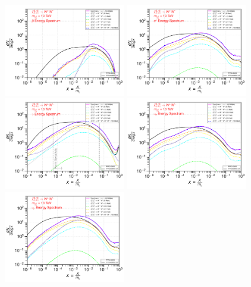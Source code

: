 \documentclass[epj,nopacs,fleqn]{svjour}
\begin{document}
\begin{figure}[!h]
	\centering
	\subfigure
	{ \includegraphics[width=0.48\textwidth]{Fig/n1ww_comparison/10000_antiprotons_n1ww_comparison.pdf} } 
	\subfigure
	{\includegraphics[width=0.48\textwidth]{Fig/n1ww_comparison/10000_positrons_n1ww_comparison.pdf} }
	\subfigure
	{\includegraphics[width=0.48\textwidth]{Fig/n1ww_comparison/10000_gammas_n1ww_comparison.pdf} }
	\subfigure
	{\includegraphics[width=0.48\textwidth]{Fig/n1ww_comparison/10000_neutrinos_e_n1ww_comparison.pdf} }
	\subfigure
	{\includegraphics[width=0.48\textwidth]{Fig/n1ww_comparison/10000_neutrinos_mu_n1ww_comparison.pdf} }

\end{figure}
\end{document}
